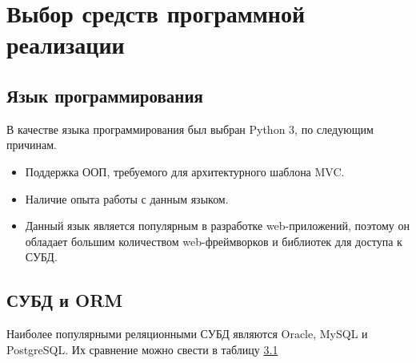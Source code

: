

\section{Выбор средств программной реализации}

\subsection{Язык программирования}
В качестве языка программирования был выбран Python 3\cite{python_doc}, по следующим причинам.
\begin{itemize}
	\item Поддержка ООП, требуемого для архитектурного шаблона MVC.
	\item Наличие опыта работы с данным языком.
	\item Данный язык является популярным в разработке web-приложений, поэтому он обладает большим количеством web-фреймворков и библиотек для доступа к СУБД.
\end{itemize}

\subsection{СУБД и ORM}
Наиболее популярными реляционными СУБД являются Oracle, MySQL и PostgreSQL\cite{dbm_source}. Их сравнение\cite{dbm_source2} можно свести в таблицу \hyperref[dms_table]{3.1}

